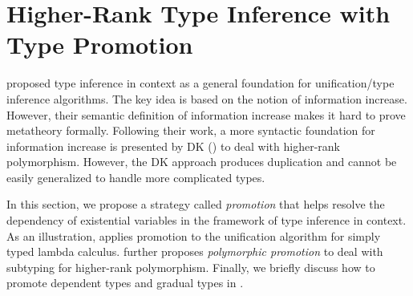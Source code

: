 \chapter{Higher-Rank Type Inference with Type Promotion}
\label{chap:Promotion}

\cite{gundry2010type} proposed type inference in context as a general foundation
for unification/type inference algorithms. The key idea is based on the notion
of information increase. However, their semantic definition of information
increase makes it hard to prove metatheory formally. Following their work, a
more syntactic foundation for information increase is presented by DK
(\cite{DK}) to deal with higher-rank polymorphism. However, the DK approach
produces duplication and cannot be easily generalized to handle more complicated
types.

In this section, we propose a strategy called \textit{promotion} that helps
resolve the dependency of existential variables in the framework of type
inference in context. As an illustration,  applies promotion
to the unification algorithm for simply typed lambda calculus.
 further proposes \textit{polymorphic promotion} to deal
with subtyping for higher-rank polymorphism. Finally, we briefly discuss how to promote
dependent types and gradual types in .








